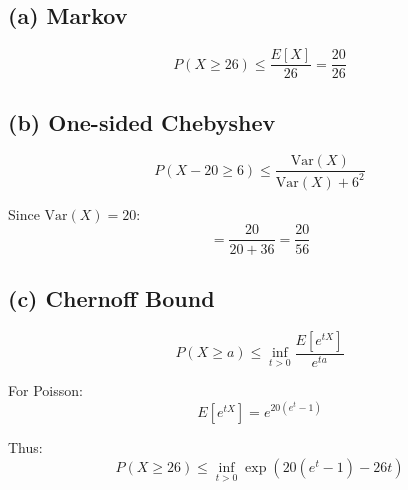 \documentclass[12pt]{article}
\begin{document}
\subsection*{(a) Markov}
\[
P(X \geq 26) \leq \frac{E[X]}{26} = \frac{20}{26}
\]

\subsection*{(b) One-sided Chebyshev}
\[
P(X - 20 \geq 6) \leq \frac{\text{Var}(X)}{\text{Var}(X) + 6^2}
\]

Since $\text{Var}(X)=20$:
\[
= \frac{20}{20+36} = \frac{20}{56}
\]

\subsection*{(c) Chernoff Bound}
\[
P(X \geq a) \leq \inf_{t>0} \frac{E[e^{tX}]}{e^{ta}}
\]

For Poisson:
\[
E[e^{tX}] = e^{20(e^t - 1)}
\]

Thus:
\[
P(X \geq 26) \leq \inf_{t>0} \exp(20(e^t - 1) - 26t)
\]
\end{document}
